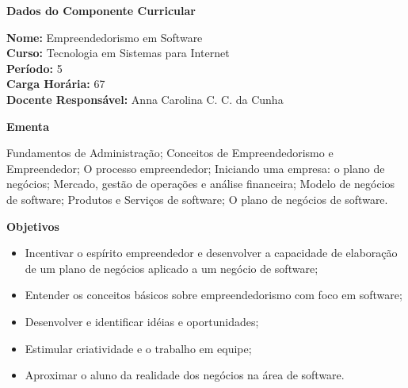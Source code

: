 

\begin{snugshade}\begin{center}\textbf{
    Dados do Componente Curricular
}\end{center}\end{snugshade}

\noindent \textbf{Nome:}                Empreendedorismo em Software
\\        \textbf{Curso:}               Tecnologia em Sistemas para Internet
\\        \textbf{Período:}             \unit{5}{\degree}
\\        \textbf{Carga Horária:}       \unit{67}{\hour}
\\        \textbf{Docente Responsável:} Anna Carolina C. C. da Cunha


\begin{snugshade}\begin{center}\textbf{
    Ementa
\vphantom{q}}\end{center}\end{snugshade}

\noindent
Fundamentos de Administração; Conceitos de Empreendedorismo e Empreendedor; O processo empreendedor; Iniciando uma empresa: o plano de negócios; Mercado, gestão de operações e análise financeira; Modelo de negócios de software; Produtos e Serviços de software; O plano de negócios de software.


\begin{snugshade}\begin{center}\textbf{
    Objetivos
}\end{center}\end{snugshade}  


\begin{itemize}

\item Incentivar o espírito empreendedor e desenvolver a capacidade de elaboração de um plano de negócios aplicado a um negócio de software;

\item Entender os conceitos básicos sobre empreendedorismo com foco em software;

\item Desenvolver e identificar idéias e oportunidades;

\item Estimular criatividade e o trabalho em equipe;

\item Aproximar o aluno da realidade dos negócios na área de software. 

\end{itemize} 


